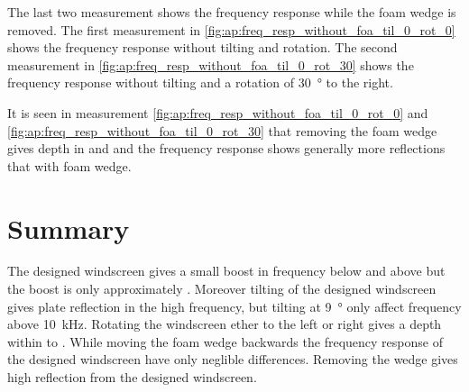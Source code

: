 The last two measurement shows the frequency response while the foam wedge is removed. The first measurement in \autoref{fig:ap:freq_resp_without_foa_til_0_rot_0} shows the frequency response without tilting and rotation. The second measurement in \autoref{fig:ap:freq_resp_without_foa_til_0_rot_30} shows the frequency response without tilting and a rotation of \SI{30}{\degree} to the right.



It is seen in measurement \autoref{fig:ap:freq_resp_without_foa_til_0_rot_0} and \autoref{fig:ap:freq_resp_without_foa_til_0_rot_30} that removing the foam wedge gives depth in  and  and the frequency response shows generally more reflections that with foam wedge.

\section*{Summary}

The designed windscreen gives a small boost in frequency below  and above  but the boost is only approximately . Moreover tilting of the designed windscreen gives plate reflection in the high frequency, but tilting at \SI{9}{\degree} only affect frequency above \SI{10}{\kilo\hertz}. Rotating the windscreen ether to the left or right gives a depth within  to . While moving the foam wedge backwards the frequency response of the designed windscreen have only neglible differences. Removing the wedge gives high reflection from the designed windscreen.





